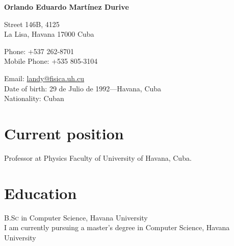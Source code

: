 \documentclass[11pt]{article} %
\begin{document}

{\LARGE\bfseries Orlando Eduardo Mart\'inez Durive} %
\bigskip\bigskip\medskip %

Street 146B, 4125 \\ %
La Lisa, Havana 17000 Cuba
\medskip %

Phone:  +537 262-8701\\ %
Mobile Phone: +535 805-3104 %
\medskip %

Email: \href{mailto:landy@fisica.uh.cu}{landy@fisica.uh.cu}\\ %



Date of birth: 29 de Julio de 1992---Havana, Cuba\\ %
Nationality: Cuban %


\section*{Current position}

Professor at Physics Faculty of University of Havana, Cuba. %



\section*{Education}

\textsc{B.Sc} in Computer Science, Havana University \\
 I am currently pursuing a master's degree in Computer Science, Havana University \\
\end{document}
